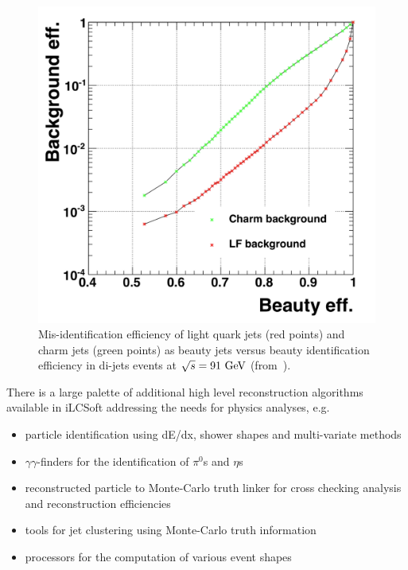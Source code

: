 \begin{figure}
\begin{center}
\includegraphics[width=0.9\hsize]{chapters/figures/SiD_flavor_tag.png}
\end{center}
\caption{Mis-identification efficiency of light quark jets (red points) and charm jets (green points) as beauty jets versus beauty identification efficiency in
  di-jets events at $\sqrt{s} = 91~\rm{GeV}$ (from~\cite{Behnke:2013lya}).} 
\label{fig:sid_flavor_tag}
\end{figure}


There is a large palette of additional high level reconstruction algorithms available in iLCSoft addressing the needs for physics analyses, e.g.
\begin{itemize}
\item particle identification using dE/dx, shower shapes and multi-variate methods
\item $\gamma\gamma$-finders for the identification of $\pi^0$s and $\eta$s
\item reconstructed particle to Monte-Carlo truth linker for cross checking analysis and reconstruction efficiencies
\item tools for jet clustering using Monte-Carlo truth information
\item processors for the computation of various event shapes 
\end{itemize}



